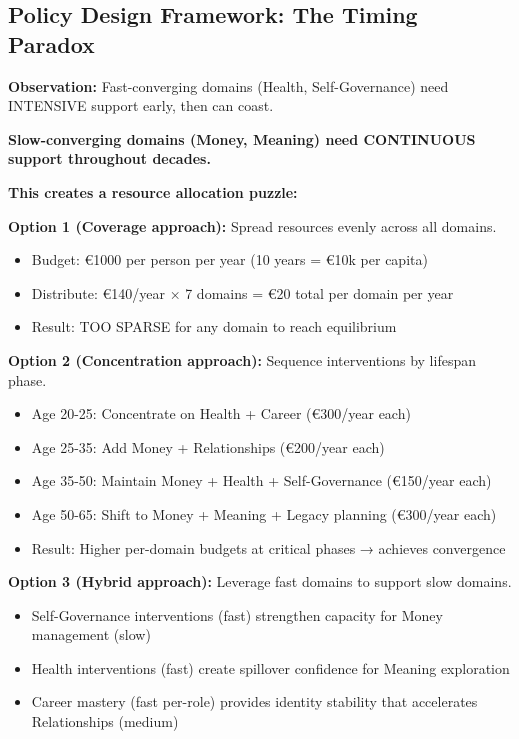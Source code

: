 {{{\subsection{Policy Design Framework: The Timing Paradox}

\textbf{Observation:} Fast-converging domains (Health, Self-Governance) need INTENSIVE support early, then can coast.

\textbf{Slow-converging domains (Money, Meaning) need CONTINUOUS support throughout decades.}

\textbf{This creates a resource allocation puzzle:}

\textbf{Option 1 (Coverage approach):} Spread resources evenly across all domains.
\begin{itemize}[nosep]
\item Budget: \euro 1000 per person per year (10 years = \euro 10k per capita)
\item Distribute: \euro 140/year × 7 domains = \euro 20 total per domain per year
\item Result: TOO SPARSE for any domain to reach equilibrium
\end{itemize}

\textbf{Option 2 (Concentration approach):} Sequence interventions by lifespan phase.
\begin{itemize}[nosep]
\item Age 20-25: Concentrate on Health + Career (\euro 300/year each)
\item Age 25-35: Add Money + Relationships (\euro 200/year each)
\item Age 35-50: Maintain Money + Health + Self-Governance (\euro 150/year each)
\item Age 50-65: Shift to Money + Meaning + Legacy planning (\euro 300/year each)
\item Result: Higher per-domain budgets at critical phases → achieves convergence
\end{itemize}

\textbf{Option 3 (Hybrid approach):} Leverage fast domains to support slow domains.
\begin{itemize}[nosep]
\item Self-Governance interventions (fast) strengthen capacity for Money management (slow)
\item Health interventions (fast) create spillover confidence for Meaning exploration
\item Career mastery (fast per-role) provides identity stability that accelerates Relationships (medium)
\end{itemize}

}}}
